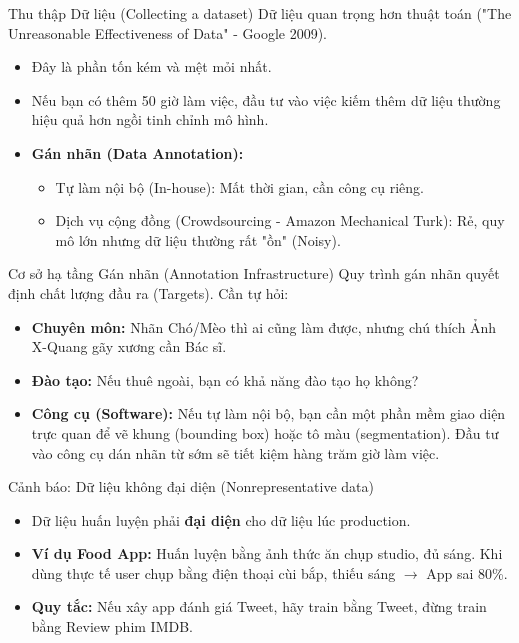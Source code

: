 \documentclass[aspectratio=169]{beamer}
\begin{document}
\begin{frame}{Thu thập Dữ liệu (Collecting a dataset)}
    Dữ liệu quan trọng hơn thuật toán ("The Unreasonable Effectiveness of Data" - Google 2009).
    \begin{itemize}
        \item Đây là phần tốn kém và mệt mỏi nhất. 
        \item Nếu bạn có thêm 50 giờ làm việc, đầu tư vào việc kiếm thêm dữ liệu thường hiệu quả hơn ngồi tinh chỉnh mô hình.
        \item \textbf{Gán nhãn (Data Annotation):}
        \begin{itemize}
            \item Tự làm nội bộ (In-house): Mất thời gian, cần công cụ riêng.
            \item Dịch vụ cộng đồng (Crowdsourcing - Amazon Mechanical Turk): Rẻ, quy mô lớn nhưng dữ liệu thường rất "ồn" (Noisy).
        \end{itemize}
    \end{itemize}
\end{frame}

\begin{frame}{Cơ sở hạ tầng Gán nhãn (Annotation Infrastructure)}
    Quy trình gán nhãn quyết định chất lượng đầu ra (Targets). Cần tự hỏi:
    \begin{itemize}
        \item \textbf{Chuyên môn:} Nhãn Chó/Mèo thì ai cũng làm được, nhưng chú thích Ảnh X-Quang gãy xương cần Bác sĩ.
        \item \textbf{Đào tạo:} Nếu thuê ngoài, bạn có khả năng đào tạo họ không?
        \item \textbf{Công cụ (Software):} Nếu tự làm nội bộ, bạn cần một phần mềm giao diện trực quan để vẽ khung (bounding box) hoặc tô màu (segmentation). Đầu tư vào công cụ dán nhãn từ sớm sẽ tiết kiệm hàng trăm giờ làm việc.
    \end{itemize}
\end{frame}

\begin{frame}{Cảnh báo: Dữ liệu không đại diện (Nonrepresentative data)}
    \begin{itemize}
        \item Dữ liệu huấn luyện phải \textbf{đại diện} cho dữ liệu lúc production.
        \item \textbf{Ví dụ Food App:} Huấn luyện bằng ảnh thức ăn chụp studio, đủ sáng. Khi dùng thực tế user chụp bằng điện thoại cùi bắp, thiếu sáng $\rightarrow$ App sai 80\%.
        \item \textbf{Quy tắc:} Nếu xây app đánh giá Tweet, hãy train bằng Tweet, đừng train bằng Review phim IMDB.
    \end{itemize}
\end{frame}
\end{document}
